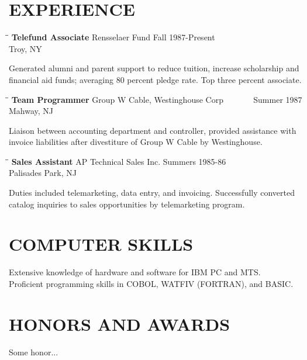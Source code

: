 \documentclass[12pt,A4]{res}
\begin{document}
\begin{resume}
\section{EXPERIENCE}
   \vspace{-0.1in}	
   \begin{tabbing}
   \hspace{2.0in}\= \hspace{2.0in}\= \kill %
    {\bf Telefund Associate} \>Rensselaer Fund     \>Fall 1987-Present\\
                             \>Troy, NY
   \end{tabbing}\vspace{-20pt}      %
    Generated alumni and parent support to reduce tuition,          
    increase scholarship and financial aid funds; averaging 80          
    percent pledge rate. Top three percent associate.
   \begin{tabbing}
   \hspace{2.0in}\= \hspace{2.0in}\= \kill %
    {\bf Team Programmer} \>Group W Cable, Westinghouse Corp \> ~~~~~~ Summer 1987\\
                          \>Mahway, NJ
   \end{tabbing}\vspace{-20pt}
    Liaison between accounting department and controller,          
    provided assistance with invoice liabilities after          
    divestiture of Group W Cable by Westinghouse.
   \begin{tabbing}%
   \hspace{2.0in}\= \hspace{2.0in}\= \kill %
   {\bf Sales Assistant}  \>AP Technical Sales Inc. \> Summers  1985-86\\
                          \>Palisades Park, NJ
   \end{tabbing}\vspace{-20pt}
    Duties included telemarketing, data entry, and invoicing.          
    Successfully converted catalog inquiries to sales          
    opportunities by telemarketing program.          


\section{COMPUTER SKILLS}          
    Extensive knowledge of hardware and software for IBM PC and          
    MTS. \\         
    Proficient programming skills in COBOL, WATFIV (FORTRAN), and          
    BASIC.          
 
 
\section{HONORS AND AWARDS}          
    Some honor... 

\end{resume}
\end{document}
